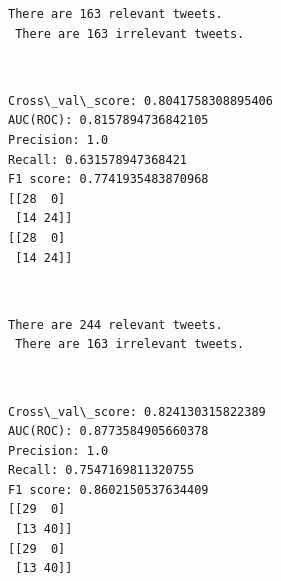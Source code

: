 \documentclass[11pt]{article}
\begin{document}
    \begin{Verbatim}[commandchars=\\\{\}]
There are 163 relevant tweets.
 There are 163 irrelevant tweets.

    \end{Verbatim}

    \begin{center}
    \end{center}
    { \hspace*{\fill} \\}
    
    \begin{Verbatim}[commandchars=\\\{\}]
Cross\_val\_score: 0.8041758308895406
AUC(ROC): 0.8157894736842105
Precision: 1.0
Recall: 0.631578947368421
F1 score: 0.7741935483870968
[[28  0]
 [14 24]]
[[28  0]
 [14 24]]

    \end{Verbatim}

    \begin{center}
    \end{center}
    { \hspace*{\fill} \\}
    
    \begin{Verbatim}[commandchars=\\\{\}]
There are 244 relevant tweets.
 There are 163 irrelevant tweets.

    \end{Verbatim}

    \begin{center}
    \end{center}
    { \hspace*{\fill} \\}
    
    \begin{Verbatim}[commandchars=\\\{\}]
Cross\_val\_score: 0.824130315822389
AUC(ROC): 0.8773584905660378
Precision: 1.0
Recall: 0.7547169811320755
F1 score: 0.8602150537634409
[[29  0]
 [13 40]]
[[29  0]
 [13 40]]

    \end{Verbatim}

    \begin{center}
    \end{center}
    { \hspace*{\fill} \\}
    
\end{document}
